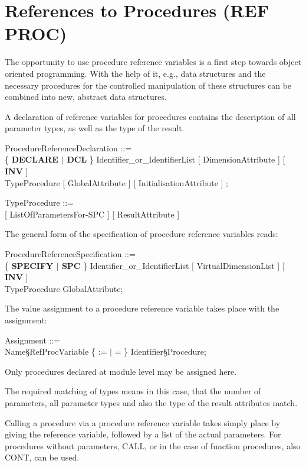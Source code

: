 \section{References to Procedures (REF PROC)}  %

The opportunity to use procedure reference variables is a first step
towards object oriented programming. With the help of it, e.g., data
structures and the necessary procedures for the controlled manipulation of
these structures can be combined into new, abstract data structures.

A declaration of reference variables for procedures contains the
description of all parameter types, as well as the type of the result.

ProcedureReferenceDeclaration ::= \\
\x \{ {\bf DECLARE $\mid$ DCL} \} Identifier\_or\_IdentifierList [ DimensionAttribute ] [ {\bf INV} ]\\
 TypeProcedure [ GlobalAttribute ] [ InitialisationAttribute ] ;

TypeProcedure ::=\\
 [ ListOfParametersFor-SPC ] [ ResultAttribute ]

The general form of the specification of procedure reference variables
reads:

ProcedureReferenceSpecification ::= \\
\x \{ {\bf SPECIFY $\mid$ SPC} \} Identifier\_or\_IdentifierList [ VirtualDimensionList ] [ {\bf INV} ]\\
 TypeProcedure GlobalAttribute;

The value assignment to a procedure reference variable takes place with
the assignment:

Assignment ::=\\
\x Name\S RefProcVariable \{ := $\mid$ = \} Identifier\S Procedure;

Only procedures declared at module level may be assigned here.

The required matching of types means in this case, that the number of
parameters, all parameter types and also the type of the result
attributes match.

Calling a procedure via a procedure reference variable takes simply
place by giving the reference variable, followed by a list of the actual
parameters. For procedures without parameters, CALL, or in the case of
function procedures, also CONT, can be used.

